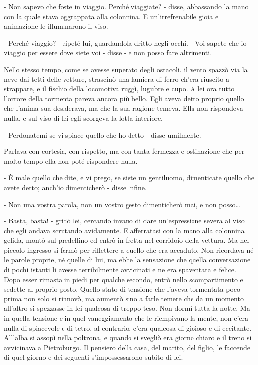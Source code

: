 - Non sapevo che foste in viaggio. Perché viaggiate? - disse, abbassando la mano con la quale stava aggrappata alla colonnina. E un'irrefrenabile gioia e animazione le illuminarono il viso. 

- Perché viaggio? - ripeté lui, guardandola dritto negli occhi. - Voi sapete che io viaggio per essere dove siete voi - disse - e non posso fare altrimenti. 

Nello stesso tempo, come se avesse superato degli ostacoli, il vento spazzò via la neve dai tetti delle vetture, strascinò una lamiera di ferro ch'era riuscito a strappare, e il fischio della locomotiva ruggì, lugubre e cupo. A lei ora tutto l'orrore della tormenta pareva ancora più bello. Egli aveva detto proprio quello che l'anima sua desiderava, ma che la sua ragione temeva. Ella non rispondeva nulla, e sul viso di lei egli scorgeva la lotta interiore. 

- Perdonatemi se vi spiace quello che ho detto - disse umilmente. 

Parlava con cortesia, con rispetto, ma con tanta fermezza e ostinazione che per molto tempo ella non poté rispondere nulla. 

- È male quello che dite, e vi prego, se siete un gentiluomo, dimenticate quello che avete detto; anch'io dimenticherò - disse infine. 

- Non una vostra parola, non un vostro gesto dimenticherò mai, e non posso\ldots{} 

- Basta, basta! - gridò lei, cercando invano di dare un'espressione severa al viso che egli andava scrutando avidamente. E afferratasi con la mano alla colonnina gelida, montò sul predellino ed entrò in fretta nel corridoio della vettura. Ma nel piccolo ingresso si fermò per riflettere a quello che era accaduto. Non ricordava né le parole proprie, né quelle di lui, ma ebbe la sensazione che quella conversazione di pochi istanti li avesse terribilmente avvicinati e ne era spaventata e felice. Dopo esser rimasta in piedi per qualche secondo, entrò nello scompartimento e sedette al proprio posto. Quello stato di tensione che l'aveva tormentata poco prima non solo si rinnovò, ma aumentò sino a farle temere che da un momento all'altro si spezzasse in lei qualcosa di troppo teso. Non dormì tutta la notte. Ma in quella tensione e in quel vaneggiamento che le riempivano la mente, non c'era nulla di spiacevole e di tetro, al contrario, c'era qualcosa di gioioso e di eccitante. All'alba si assopì nella poltrona, e quando si svegliò era giorno chiaro e il treno si avvicinava a Pietroburgo. Il pensiero della casa, del marito, del figlio, le faccende di quel giorno e dei seguenti s'impossessarono subito di lei. 

